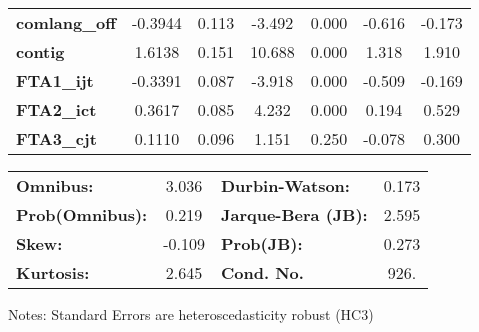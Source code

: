 \begin{center}
\begin{tabular}{lcccccc}
\textbf{comlang\_off} &      -0.3944  &        0.113     &    -3.492  &         0.000        &       -0.616    &       -0.173     \\
\textbf{contig}       &       1.6138  &        0.151     &    10.688  &         0.000        &        1.318    &        1.910     \\
\textbf{FTA1\_ijt}    &      -0.3391  &        0.087     &    -3.918  &         0.000        &       -0.509    &       -0.169     \\
\textbf{FTA2\_ict}    &       0.3617  &        0.085     &     4.232  &         0.000        &        0.194    &        0.529     \\
\textbf{FTA3\_cjt}    &       0.1110  &        0.096     &     1.151  &         0.250        &       -0.078    &        0.300     \\
\bottomrule
\end{tabular}
\begin{tabular}{lclc}
\textbf{Omnibus:}       &  3.036 & \textbf{  Durbin-Watson:     } &    0.173  \\
\textbf{Prob(Omnibus):} &  0.219 & \textbf{  Jarque-Bera (JB):  } &    2.595  \\
\textbf{Skew:}          & -0.109 & \textbf{  Prob(JB):          } &    0.273  \\
\textbf{Kurtosis:}      &  2.645 & \textbf{  Cond. No.          } &     926.  \\
\bottomrule
\end{tabular}
\end{center}

Notes: \newline
 [1] Standard Errors are heteroscedasticity robust (HC3)